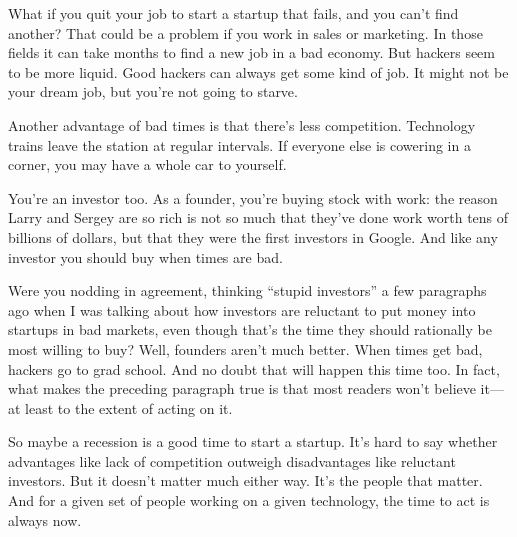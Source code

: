 What if you quit your job to start a startup that fails, and you can't
find another? That could be a problem if you work in sales or marketing.
In those fields it can take months to find a new job in a bad economy.
But hackers seem to be more liquid. Good hackers can always get some
kind of job. It might not be your dream job, but you're not going to
starve.

Another advantage of bad times is that there's less competition.
Technology trains leave the station at regular intervals. If everyone
else is cowering in a corner, you may have a whole car to yourself.

You're an investor too. As a founder, you're buying stock with work: the
reason Larry and Sergey are so rich is not so much that they've done
work worth tens of billions of dollars, but that they were the first
investors in Google. And like any investor you should buy when times are
bad.

Were you nodding in agreement, thinking ``stupid investors'' a few
paragraphs ago when I was talking about how investors are reluctant to
put money into startups in bad markets, even though that's the time they
should rationally be most willing to buy? Well, founders aren't much
better. When times get bad, hackers go to grad school. And no doubt that
will happen this time too. In fact, what makes the preceding paragraph
true is that most readers won't believe it---at least to the extent of
acting on it.

So maybe a recession is a good time to start a startup. It's hard to say
whether advantages like lack of competition outweigh disadvantages like
reluctant investors. But it doesn't matter much either way. It's the
people that matter. And for a given set of people working on a given
technology, the time to act is always now.